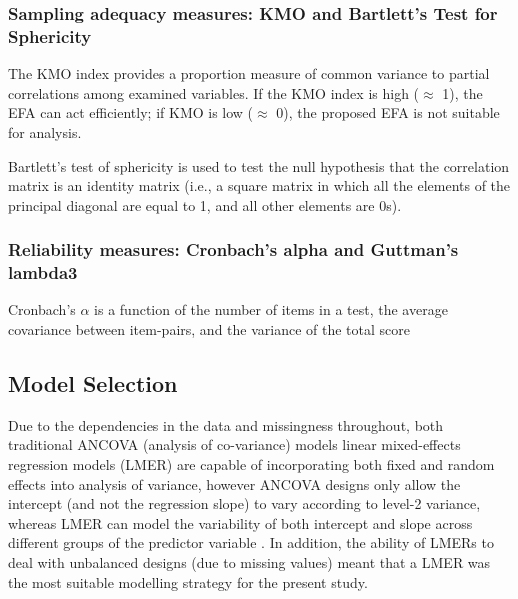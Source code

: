 \begin{CJK}{UTF8}{gbsn}
\subsubsection{Sampling adequacy measures: KMO and Bartlett's Test for Sphericity \label{app8:samplingAdequacy}}

The KMO index provides a proportion measure of common variance to partial correlations among examined variables.  If the KMO index is high ($\approx$ 1), the EFA can act efficiently; if KMO is low ($\approx$ 0), the proposed EFA is not suitable for analysis.

Bartlett’s test of sphericity is used to test the null hypothesis that the correlation matrix is an identity matrix (i.e., a square matrix in which all the elements of the principal diagonal are equal to 1, and all other elements are 0s).

\subsubsection{Reliability measures: Cronbach's alpha and Guttman's lambda3\label{app8:reliabilityMeasures}}

Cronbach's $\alpha$ is a function of the number of items in a test, the average covariance between item-pairs, and the variance of the total score \citep{Tabachnick2007}



\subsection{Model Selection\label{app8:modelSelection}}
Due to the dependencies in the data and missingness throughout, both traditional ANCOVA (analysis of co-variance) models linear mixed-effects regression models (LMER) are capable of incorporating both fixed and random effects into analysis of variance, however ANCOVA designs only allow the intercept (and not the regression slope) to vary according to level-2 variance, whereas LMER can model the variability of both intercept and slope across different groups of the predictor variable \citep{Field2012}. In addition, the ability of LMERs to deal with unbalanced designs (due to missing values) meant that a LMER was the most suitable modelling strategy for the present study.


\end{CJK}
